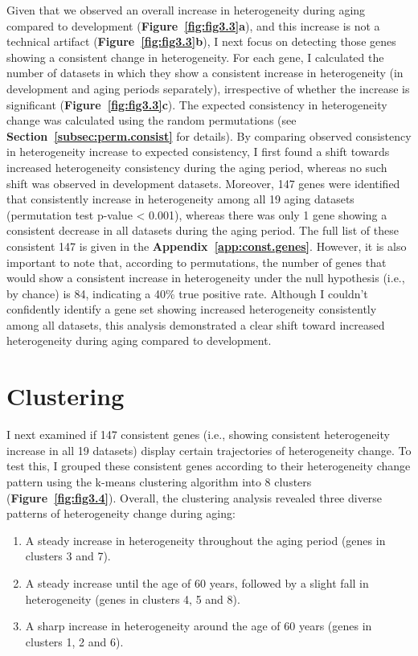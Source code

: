 Given that we observed an overall increase in heterogeneity during aging compared to development (\textbf{Figure~\ref{fig:fig3.3}a}),
and this increase is not a technical artifact (\textbf{Figure~\ref{fig:fig3.3}b}), I next focus on detecting those genes showing a consistent change in heterogeneity. 
For each gene, I calculated the number of datasets in which they show a  consistent increase in heterogeneity (in development and aging periods separately), 
irrespective of whether the increase is significant (\textbf{Figure~\ref{fig:fig3.3}c}).
The expected consistency in heterogeneity change was calculated using the random permutations (see \textbf{Section~\ref{subsec:perm.consist}} for details).
By comparing observed consistency in heterogeneity increase to expected consistency, I first found a shift towards increased heterogeneity consistency
during the aging period, whereas no such shift was observed in development datasets.
Moreover, 147 genes were identified that consistently increase in heterogeneity among all 19 aging datasets (permutation test p-value < 0.001), 
whereas there was only 1 gene showing a consistent decrease in all datasets during the aging period.
The full list of these consistent 147 is given in the \textbf{Appendix~\ref{app:const.genes}}.
However, it is also important to note that, according to permutations, 
the number of genes that would show a consistent increase in heterogeneity under the null hypothesis (i.e., by chance) is 84,
indicating a 40\% true positive rate.
Although I couldn't confidently identify a gene set showing increased heterogeneity consistently among all datasets,
this analysis demonstrated a clear shift toward increased heterogeneity during aging compared to development. 

\section{Clustering}
I next examined if 147 consistent genes (i.e., showing consistent heterogeneity increase in all 19 datasets) display certain trajectories of heterogeneity change.
To test this, I grouped these consistent genes according to their heterogeneity change pattern using the k-means clustering algorithm into 8 clusters (\textbf{Figure~\ref{fig:fig3.4}}).
Overall, the clustering analysis revealed three diverse patterns of heterogeneity change during aging:

\begin{enumerate}
    \item A steady increase in heterogeneity throughout the aging period (genes in clusters 3 and 7).
    \item A steady increase until the age of 60 years, followed by a slight fall in heterogeneity (genes in clusters 4, 5 and 8).
    \item A sharp increase in heterogeneity around the age of 60 years (genes in clusters 1, 2 and 6).
\end{enumerate}


